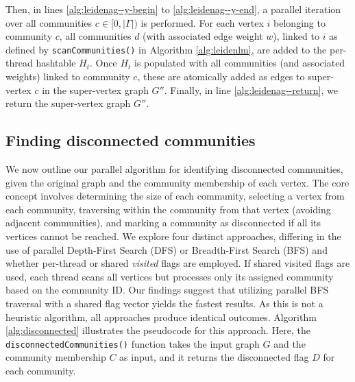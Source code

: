 Then, in lines \ref{alg:leidenag--y-begin} to \ref{alg:leidenag--y-end}, a parallel iteration over all communities $c \in [0, |\Gamma|)$ is performed. For each vertex $i$ belonging to community $c$, all communities $d$ (with associated edge weight $w$), linked to $i$ as defined by \texttt{scanCommunities()} in Algorithm \ref{alg:leidenlm}, are added to the per-thread hashtable $H_t$. Once $H_t$ is populated with all communities (and associated weights) linked to community $c$, these are atomically added as edges to super-vertex $c$ in the super-vertex graph $G''$. Finally, in line \ref{alg:leidenag--return}, we return the super-vertex graph $G''$.




\subsection{Finding disconnected communities}

We now outline our parallel algorithm for identifying disconnected communities, given the original graph and the community membership of each vertex. The core concept involves determining the size of each community, selecting a vertex from each community, traversing within the community from that vertex (avoiding adjacent communities), and marking a community as disconnected if all its vertices cannot be reached. We explore four distinct approaches, differing in the use of parallel Depth-First Search (DFS) or Breadth-First Search (BFS) and whether per-thread or shared \textit{visited} flags are employed. If shared visited flags are used, each thread scans all vertices but processes only its assigned community based on the community ID. Our findings suggest that utilizing parallel BFS traversal with a shared flag vector yields the fastest results. As this is not a heuristic algorithm, all approaches produce identical outcomes. Algorithm \ref{alg:disconnected} illustrates the pseudocode for this approach. Here, the \texttt{disconnectedCommunities()} function takes the input graph $G$ and the community membership $C$ as input, and it returns the disconnected flag $D$ for each community.

